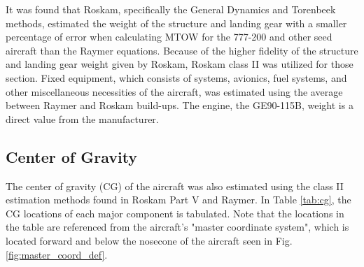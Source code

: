 It was found that Roskam, specifically the General Dynamics and Torenbeek methods, estimated the weight of the structure and landing gear with a smaller percentage of error when calculating MTOW for the 777-200 and other seed aircraft than the Raymer equations. Because of the higher fidelity of the structure and landing gear weight given by Roskam, Roskam class II was utilized for those section. Fixed equipment, which consists of systems, avionics, fuel systems, and other miscellaneous necessities of the aircraft, was estimated using the average between Raymer and Roskam build-ups. The engine, the GE90-115B, weight is a direct value from the manufacturer.\cite{roskam_5}\cite{raymer}

\newpage
\subsection{Center of Gravity}
The center of gravity (CG) of the aircraft was also estimated using the class II estimation methods found in Roskam Part V and Raymer.\cite{roskam_5}\cite{raymer} In Table \ref{tab:cg}, the CG locations of each major component is tabulated. Note that the locations in the table are referenced from the aircraft's "master coordinate system", which is located forward and below the nosecone of the aircraft seen in Fig. \ref{fig:master_coord_def}.


